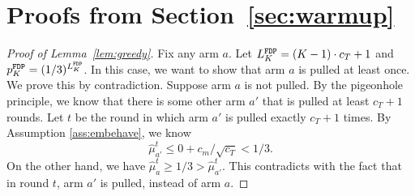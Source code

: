 \section{Proofs from Section~\ref{sec:warmup}}
\label{app:warmup}

\begin{proof}[Proof of Lemma~\ref{lem:greedy}]
  Fix any arm $a$. Let $L^\mathtt{FDP}_K = (K-1) \cdot c_T + 1$ and
  $p^\mathtt{FDP}_K = (1/3)^{L^\mathtt{FDP}_K}$. 
  In this case, we want to show that arm $a$ is pulled at least
  once. We prove this by contradiction. Suppose arm $a$ is not pulled. By
  the pigeonhole principle, we know that there is some other arm $a'$
  that is pulled at least $c_T + 1$ rounds. Let $t$ be the round in
  which arm $a'$ is pulled exactly $c_T + 1$ times. By Assumption
  \ref{ass:embehave}, we know
  \[
    \hat{\mu}_{a'}^t \leq 0 + c_m / \sqrt{c_T} < 1/3.
  \]
   On the other hand, we have
  $\hat{\mu}_a^t \geq 1/3 > \hat{\mu}_{a'}^t$. This contradicts with
  the fact that in round $t$, arm $a'$ is pulled, instead of arm $a$.
\end{proof}


